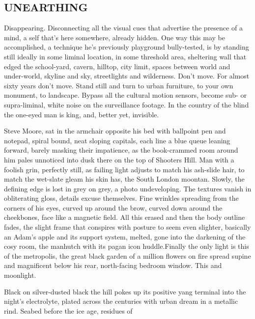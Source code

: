 \documentclass[
]{article}
\author{}
\date{}
\begin{document}
\begin{center}
\section{UNEARTHING}\label{unearthing}
\end{center}

Disappearing. Disconnecting all the visual cues that advertise the
presence of a mind, a self that's here somewhere, already hidden. One
way this may be accomplished, a technique he's previously playground
bully-tested, is by standing still ideally in some liminal location, in
some threshold area, sheltering wall that edged the school-yard, cavern,
hilltop, city limit, spaces between world and under-world, skyline and
sky, streetlights and wilderness. Don't move. For almost sixty years
don't move. Stand still and turn to urban furniture, to your own
monument, to landscape. Bypass all the cultural motion sensors, become
sub- or supra-liminal, white noise on the surveillance footage. In the
country of the blind the one-eyed man is king, and, better yet,
invisible. \par
Steve Moore, sat in the armchair opposite his bed with ballpoint
pen and notepad, spiral bound, neat sloping capitals, each line a blue
queue leaning forward, barely masking their impatience, as the
book-crammed room around him pales unnoticed into dusk there on the top
of Shooters Hill. Man with a foolish grin, perfectly still, as failing
light adjusts to match his ash-slide hair, to match the wet-slate gleam
his skin has, the South London moontan. Slowly, the defining edge is
lost in grey on grey, a photo undeveloping. The textures vanish in
obliterating gloss, details excuse themselves. Fine wrinkles spreading
from the corners of his eyes, curved up around the brow, curved down
around the cheekbones, face like a magnetic field. All this erased and
then the body outline fades, the slight frame that conspires with
posture to seem even slighter, basically an Adam's apple and its support
system, melted, gone into the darkening of the cosy room, the manhutch
with its pagan icon huddle.Finally the only light is this of the
metropolis, the great black garden of a million flowers on fire spread
supine and magnificent below his rear, north-facing bedroom window. This
and moonlight. \par
Black on silver-dusted black the hill pokes up its positive yang
terminal into the night's electrolyte, plated across the centuries with
urban dream in a metallic rind. Seabed before the ice age, residues of
\end{document}
